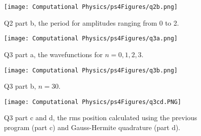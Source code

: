 \documentclass[11pt]{article}
\begin{document}
\begin{figure}[b!]
\centering
\texttt{[image: Computational Physics/ps4Figures/q2b.png]}
\caption{Q2 part b, the period for amplitudes ranging from 0 to 2.}
  \label{fig:Q2b}
\end{figure}

\begin{figure}[b!]
\centering
\texttt{[image: Computational Physics/ps4Figures/q3a.png]}
\caption{Q3 part a, the wavefunctions for $n=0,1,2,3$.}
  \label{fig:Q3a}
\end{figure}

\begin{figure}[b!]
\centering
\texttt{[image: Computational Physics/ps4Figures/q3b.png]}
\caption{Q3 part b, $n=30$.}
  \label{fig:Q3b}
\end{figure}

\begin{figure}[b!]
\centering
\texttt{[image: Computational Physics/ps4Figures/q3cd.PNG]}
\caption{Q3 part c and d, the rms position calculated using the previous program (part c) and Gauss-Hermite quadrature (part d).}
  \label{fig:Q3cd}
\end{figure}



\end{document}
